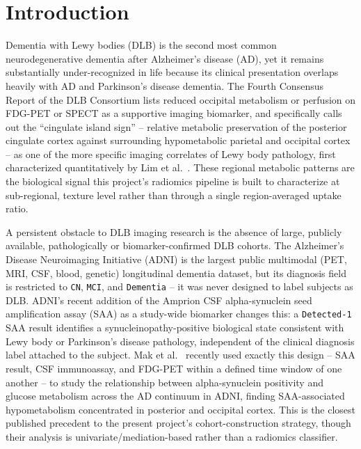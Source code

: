 \section{Introduction}
\label{sec:introduction}

Dementia with Lewy bodies (DLB) is the second most common neurodegenerative dementia after Alzheimer's disease (AD), yet it remains substantially under-recognized in life because its clinical presentation overlaps heavily with AD and Parkinson's disease dementia. The Fourth Consensus Report of the DLB Consortium \cite{mckeith2017dlb} lists reduced occipital metabolism or perfusion on FDG-PET or SPECT as a supportive imaging biomarker, and specifically calls out the ``cingulate island sign'' -- relative metabolic preservation of the posterior cingulate cortex against surrounding hypometabolic parietal and occipital cortex -- as one of the more specific imaging correlates of Lewy body pathology, first characterized quantitatively by Lim et al.\ \cite{lim2009cingulateisland}. These regional metabolic patterns are the biological signal this project's radiomics pipeline is built to characterize at sub-regional, texture level rather than through a single region-averaged uptake ratio.

A persistent obstacle to DLB imaging research is the absence of large, publicly available, pathologically or biomarker-confirmed DLB cohorts. The Alzheimer's Disease Neuroimaging Initiative (ADNI) is the largest public multimodal (PET, MRI, CSF, blood, genetic) longitudinal dementia dataset, but its diagnosis field is restricted to \texttt{CN}, \texttt{MCI}, and \texttt{Dementia} -- it was never designed to label subjects as DLB. ADNI's recent addition of the Amprion CSF alpha-synuclein seed amplification assay (SAA) as a study-wide biomarker changes this: a \texttt{Detected-1} SAA result identifies a synucleinopathy-positive biological state consistent with Lewy body or Parkinson's disease pathology, independent of the clinical diagnosis label attached to the subject. Mak et al.\ \cite{mak2025alphasynuclein} recently used exactly this design -- SAA result, CSF immunoassay, and FDG-PET within a defined time window of one another -- to study the relationship between alpha-synuclein positivity and glucose metabolism across the AD continuum in ADNI, finding SAA-associated hypometabolism concentrated in posterior and occipital cortex. This is the closest published precedent to the present project's cohort-construction strategy, though their analysis is univariate/mediation-based rather than a radiomics classifier.

